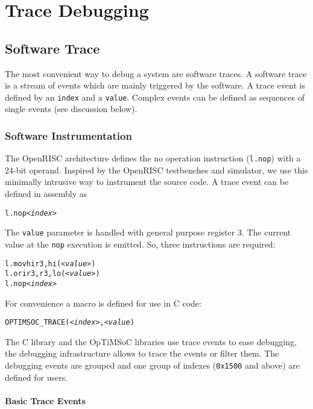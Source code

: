 \chapter{Trace Debugging}

\section{Software Trace}

The most convenient way to debug a system are software traces. A
software trace is a stream of events which are mainly triggered by the
software. A trace event is defined by an \verb|index| and a
\verb|value|. Complex events can be defined as sequences of single
events (see discussion below).

\subsection{Software Instrumentation}

The OpenRISC architecture defines the no operation instruction
(\verb|l.nop|) with a 24-bit operand. Inspired by the OpenRISC
testbenches and simulator, we use this minimally intrusive way to
instrument the source code. A trace event can be defined in assembly
as

\begin{alltt}
l.nop \emph{<index>}
\end{alltt}

The \verb|value| parameter is handled with general purpose register 3.
The current value at the \verb|nop| execution is emitted. So, three
instructions are required:

\begin{alltt}
l.movhi r3, hi(\emph{<value>})
l.ori r3, r3, lo(\emph{<value>})
l.nop \emph{<index>}
\end{alltt}

For convenience a macro is defined for use in C code:

\begin{alltt}
OPTIMSOC_TRACE(\emph{<index>}, \emph{<value})
\end{alltt}

The C library and the OpTiMSoC libraries use trace events to ease
debugging, the debugging infrastructure allows to trace the events or
filter them. The debugging events are grouped and one group of indexes
(\verb|0x1500| and above) are defined for users.

\subsubsection{Basic Trace Events}

